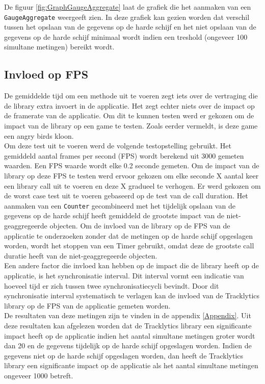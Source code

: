 De figuur \ref{fig:GraphGaugeAggregate} laat de grafiek die het aanmaken van een \texttt{GaugeAggregate} weergeeft zien. In deze grafiek kan gezien worden dat verschil tussen het opslaan van de gegevens op de harde schijf en het niet opslaan van de gegevens op de harde schijf minimaal wordt indien een treshold (ongeveer 100 simultane metingen) bereikt wordt. \\


\subsection{Invloed op FPS}
De gemiddelde tijd om een methode uit te voeren zegt iets over de vertraging die de library extra invoert in de applicatie. Het zegt echter niets over de impact op de framerate van de applicatie. Om dit te kunnen testen werd er gekozen om de impact van de library op een game te testen. Zoals eerder vermeldt, is deze game een angry birds kloon. \\

Om deze test uit te voeren werd de volgende testopstelling gebruikt. Het gemiddeld aantal frames per second (FPS) wordt berekend uit 3000 gemeten waarden. Een FPS waarde wordt elke 0.2 seconde gemeten. Om de impact van de library op deze FPS te testen werd ervoor gekozen om elke seconde X aantal keer een library call uit te voeren en deze X gradueel te verhogen. Er werd gekozen om de worst case test uit te voeren gebaseerd op de test van de call duration. Het aanmaken van een \texttt{Counter} gecombineerd met het tijdelijk opslaan van de gegevens op de harde schijf heeft gemiddeld de grootste impact van de niet-geaggregeerde objecten. Om de invloed van de library op de FPS van de applicatie te onderzoeken zonder dat de metingen op de harde schijf opgeslagen worden, wordt het stoppen van een Timer gebruikt, omdat deze de grootste call duratie heeft van de niet-geaggregeerde objecten. \\

Een andere factor die invloed kan hebben op de impact die de library heeft op de applicatie, is het synchronisatie interval. Dit interval vormt een indicatie van hoeveel tijd er zich tussen twee synchronisatiecycli bevindt. Door dit synchronisatie interval systematisch te verlagen kan de invloed van de Tracklytics library op de FPS van de applicatie gemeten worden. \\


De resultaten van deze metingen zijn te vinden in de appendix \ref{Appendix}. Uit deze resultaten kan afgelezen worden dat de Tracklytics library een significante impact heeft op de applicatie indien het aantal simultane metingen groter wordt dan 20 en de gegevens tijdelijk op de harde schijf opgeslagen worden. Indien de gegevens niet op de harde schijf opgeslagen worden, dan heeft de Tracklytics library een significante impact op de applicatie als het aantal simultane metingen ongeveer 1000 betreft. \\



